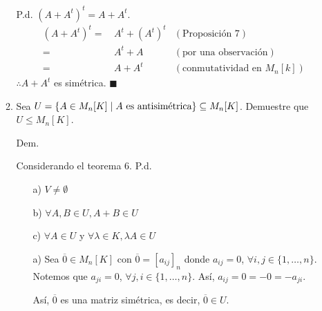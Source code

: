 \documentclass[fleqn]{article}                       %
\begin{document}
\begin{enumerate}
\begin{enumerate}
            P.d. $ (A + A^t)^t = A + A^t $.
            \begin{align*}
                (A + A^t)^t =& \, A^t + (A^t)^t & (\text{Proposición 7}) \\
                =& \, A^t + A & (\text{por una observación}) \\
                =& \, A + A^t & (\text{conmutatividad en } M_n[k])
            \end{align*}
            $ \therefore A + A^t $ es simétrica. $ \blacksquare $

            \item Sea $ U = \left \{A \in M_n [K] \; \middle \arrowvert \; A \text{ es antisimétrica} \right \} \subseteq M_n [K] $. Demuestre que $ U \leq M_n[K] $. \par
            
            \hspace{2.7mm}  Dem. \par
            \begin{minipage}[c]{5cm}
                \vspace{-1.7cm} Considerando el teorema 6. P.d. 
            \end{minipage} \begin{minipage}[b]{6cm}
                \begin{enumerate}
                    \item[a)] $ V \neq \emptyset $
                    \item[b)] $ \forall A, B \in U, A + B \in U $
                    \item[c)] $ \forall A \in U $ y $ \forall \lambda \in K, \lambda A \in U $
                \end{enumerate}
            \end{minipage}

            \begin{enumerate}
                \item[a)] Sea $ \overline{0} \in M_n [K] $ con $ \overline{0} = [a_{ij}]_n $ donde $ a_{ij} = 0 $, $ \forall i, j \in \{1, \ldots, n\} $. Notemos que $ a_{ji} = 0 $, $ \forall j, i \in \{1, \ldots, n\} $. Así, $ a_{ij} = 0 = -0 = -a_{ji} $. \par 
                
                Así, $ \overline{0} $ es una matriz simétrica, es decir, $ \overline{0} \in U $. \par


\end{enumerate}
\end{enumerate}
\end{enumerate}
\end{document}
